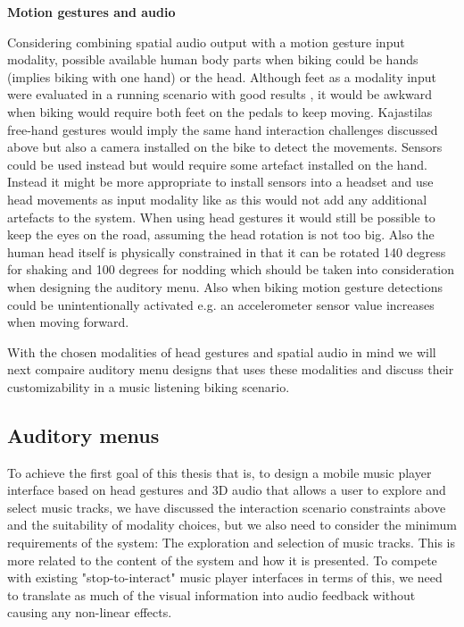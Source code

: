 \textbf{Motion gestures and audio}

Considering combining spatial audio output with a motion gesture input modality, possible available human body parts when biking could be hands (implies biking with one hand) or the head. Although feet as a modality input were evaluated in a running scenario with good results \cite{smus_running_2010}, it would be awkward when biking would require both feet on the pedals to keep moving. Kajastilas free-hand gestures \cite{kajastila_interaction_2013} would imply the same hand interaction challenges discussed above but also a camera installed on the bike to detect the movements. Sensors could be used instead but would require some artefact installed on the hand. Instead it might be more appropriate to install sensors into a headset and use head movements as input modality like \cite{park_gaze-directed_2011, brewster_multimodaleyes-freeinteraction_2003} as this would not add any additional artefacts to the system. When using head gestures it would still be possible to keep the eyes on the road, assuming the head rotation is not too big. Also the human head itself is physically constrained in that it can be rotated 140 degress for shaking and 100 degrees for nodding \cite{lopresti_neck_2000} which should be taken into consideration when designing the auditory menu. Also when biking motion gesture detections could be unintentionally activated e.g. an accelerometer sensor value increases when moving forward.

With the chosen modalities of head gestures and spatial audio in mind we will next compaire auditory menu designs that uses these modalities and discuss their customizability in a music listening biking scenario.

\subsection{Auditory menus}
To achieve the first goal of this thesis that is, to design a mobile music player interface based on head gestures and 3D audio that allows a user to explore and select music tracks, we have discussed the interaction scenario constraints above and the suitability of modality choices, but we also need to consider the minimum requirements of the system: The exploration and selection of music tracks. This is more related to the content of the system and how it is presented. To compete with existing "stop-to-interact" music player interfaces in terms of this, we need to translate as much of the visual information into audio feedback without causing any non-linear effects.

